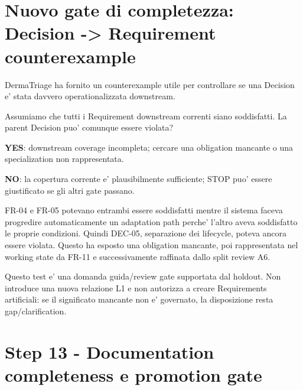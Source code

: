 \documentclass[11pt,a4paper]{article}
\begin{document}
\section{Nuovo gate di completezza: Decision -> Requirement counterexample}
\holdouttag

DermaTriage ha fornito un counterexample utile per controllare se una Decision e' stata davvero operationalizzata downstream.

\begin{ddtacheck}[title={Decision-to-Requirement completeness test}]
Assumiamo che tutti i Requirement downstream correnti siano soddisfatti. La parent Decision puo' comunque essere violata?\par
\textbf{YES}: downstream coverage incompleta; cercare una obligation mancante o una specialization non rappresentata.\par
\textbf{NO}: la copertura corrente e' plausibilmente sufficiente; STOP puo' essere giustificato se gli altri gate passano.
\end{ddtacheck}

\begin{ddtaexample}[title={DermaTriage DEC-05}]
FR-04 e FR-05 potevano entrambi essere soddisfatti mentre il sistema faceva progredire automaticamente un adaptation path perche' l'altro aveva soddisfatto le proprie condizioni. Quindi DEC-05, separazione dei lifecycle, poteva ancora essere violata. Questo ha esposto una obligation mancante, poi rappresentata nel working state da FR-11 e successivamente raffinata dallo split review A6.
\end{ddtaexample}

\begin{ddtaworking}[title={Status del gate}]
Questo test e' una domanda guida/review gate supportata dal holdout. Non introduce una nuova relazione L1 e non autorizza a creare Requirements artificiali: se il significato mancante non e' governato, la disposizione resta gap/clarification.
\end{ddtaworking}

\section{Step 13 - Documentation completeness e promotion gate}
\closedtag
\end{document}
